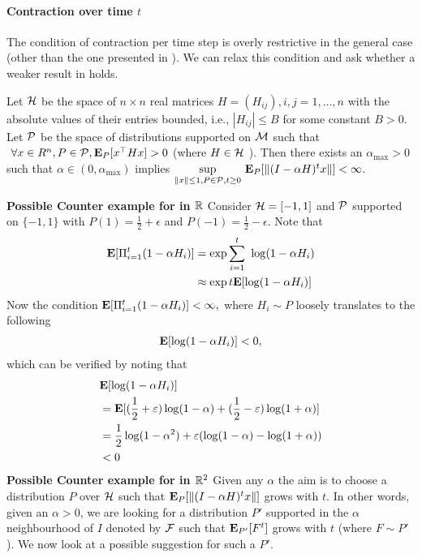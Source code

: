 \paragraph{Contraction over time $t$}
The condition of contraction per time step is overly restrictive in the general case (other than the one presented in ). We can relax this condition and ask whether a weaker result in  holds.
\begin{lemma}\label{multheorem}
Let $\H$ be the space of $n\times n$ real matrices $H=(H_{ij}),i,j=1,\ldots,n$ with the absolute values of their entries bounded, i.e., $|H_{ij}|\leq B$ for some constant $B>0$. Let $\P$ be the space of distributions supported on $\M$ such that $~\forall x\in R^n, P\in \P,\E_{P}[x^\top H x] >0$ (where $H\in\H$ ). Then there exists an $\alpha_{\max}>0$ such that $\alpha\in(0,\alpha_{\max})$ implies $\us{\sup}{\norm{x}\leq 1,P\in\P,t\geq 0}\E_{P}[\norm{(I-\alpha H)^tx}]< \infty$.
\end{lemma}
\textbf{Possible Counter example for  in $\R$}
Consider $\H=[-1,1]$ and $\P$ supported on $\{-1,1\}$ with $P(1)=\frac{1}{2}+\epsilon$ and $P(-1)=\frac{1}{2}-\epsilon$. Note that
\begin{align*}
\E[\Pi_{i=1}^t (1-\alpha H_i)]&=\exp{\ous{\sum}{i=1}{t}\log(1-\alpha H_i)}\\
&\approx \exp{t\E[\log(1-\alpha H_i)]}
\end{align*}
Now the condition $\E[\Pi_{i=1}^t (1-\alpha H_i)]<\infty,$ where $H_i\sim P$ loosely translates to the following
\begin{align*}
\E[\log(1-\alpha H_i)]<0,
\end{align*}
which can be verified by noting that
\begin{align*}
&\E[\log(1-\alpha H_i)]\\&=\E[(\frac{1}{2}+\epsilon)\log (1-\alpha)+(\frac{1}{2}-\epsilon)\log (1+\alpha)]\\
&=\frac{1}{2}\log(1-\alpha^2)+\epsilon(\log(1-\alpha)-\log(1+\alpha))\\
&<0
\end{align*}
\textbf{Possible Counter example for  in $\R^2$}
Given any $\alpha$ the aim is to choose a distribution $P$ over $\H$ such that $\E_{P}[\norm{(I-\alpha H)^tx}]$ grows with $t$. In other words, given an $\alpha>0$, we are looking for a distribution $P'$ supported in the $\alpha$ neighbourhood of $I$ denoted by $\F$ such that $\E_{P'}[F^t]$ grows with $t$ (where $F\sim P'$). We now look at a possible suggestion for such a $P'$.\par
